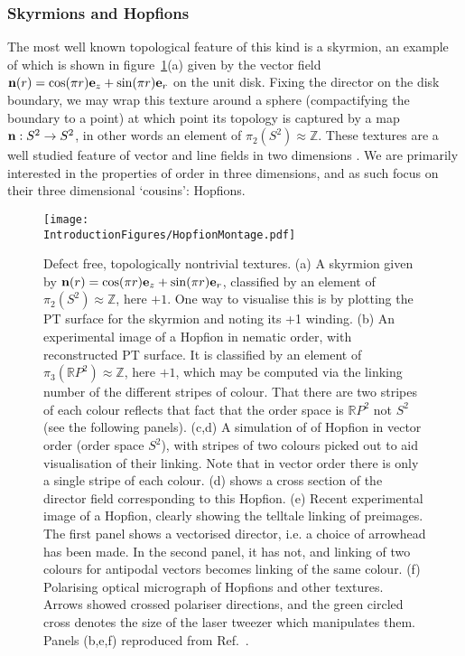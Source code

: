 \subsubsection{Skyrmions and Hopfions}
The most well known topological feature of this kind is a skyrmion, an example of which is shown in figure~\ref{fig:HopfionMontage}(a) given by the vector field ${\bf n}(r) = \cos(\pi r) {\bf e}_z + \sin(\pi r) {\bf e}_r$ on the unit disk. Fixing the director on the disk boundary, we may wrap this texture around a sphere (compactifying the boundary to a point) at which point its topology is captured by a map ${\bf n} : S^2 \rightarrow S^2$, in other words an element of $\pi_2 (S^2)\approx \mathbb{Z}$. These textures are a well studied feature of vector and line fields in two dimensions \citep{AlexanderBook}. We are primarily interested in the properties of order in three dimensions, and as such focus on their three dimensional `cousins': Hopfions.
\begin{figure}[htbp]
\centering
\texttt{[image: \\IntroductionFigures/HopfionMontage.pdf]}
\caption{Defect free, topologically nontrivial textures. (a) A skyrmion given by ${\bf n}(r) = \cos(\pi r) {\bf e}_z + \sin(\pi r) {\bf e}_r$, classified by an element of $\pi_2(S^2)\approx \mathbb{Z}$, here $+1$. One way to visualise this is by plotting the PT surface for the skyrmion and noting its +1 winding. (b) An experimental image of a Hopfion in nematic order, with reconstructed PT surface. It is classified by an element of $\pi_3(\mathbb{R}P^2)\approx \mathbb{Z}$, here $+1$, which may be computed via the linking number of the different stripes of colour. That there are two stripes of each colour reflects that fact that the order space is $\mathbb{R}P^2$ not $S^2$ (see the following panels). (c,d) A simulation of of Hopfion in vector order (order space $S^2$), with stripes of two colours picked out to aid visualisation of their linking. Note that in vector order there is only a single stripe of each colour. (d) shows a cross section of the director field corresponding to this Hopfion. (e) Recent experimental image of a Hopfion, clearly showing the telltale linking of preimages. The first panel shows a vectorised director, i.e. a choice of arrowhead has been made. In the second panel, it has not, and linking of two colours for antipodal vectors becomes linking of the same colour. (f) Polarising optical micrograph of Hopfions and other textures. Arrows showed crossed polariser directions, and the green circled cross denotes the size of the laser tweezer which manipulates them. Panels (b,e,f) reproduced from Ref.~\citep{Chen2013,Ackerman2017}.}
\label{fig:HopfionMontage}
\end{figure}
